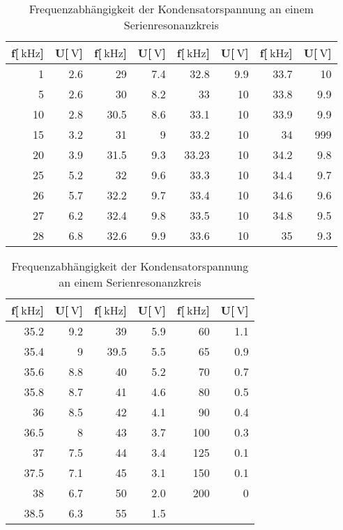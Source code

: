 \begin{table}
\begin{center}
\begin{tabular}{r|r|r|r|r|r|r|r}
f[$\SI{}{\kilo\hertz}$] & U[$\SI{}{\volt}$] & f[$\SI{}{\kilo\hertz}$] & U[$\SI{}{\volt}$] & f[$\SI{}{\kilo\hertz}$] & U[$\SI{}{\volt}$] & f[$\SI{}{\kilo\hertz}$] & U[$\SI{}{\volt}$] \\
\hline
1 & 2.6 & 29 & 7.4 & 32.8 & 9.9 & 33.7 & 10 \\
5 & 2.6 & 30 & 8.2 & 33 & 10 & 33.8 & 9.9 \\
10 & 2.8 & 30.5 & 8.6 & 33.1 & 10 & 33.9 & 9.9 \\
15 & 3.2 & 31 & 9 & 33.2 & 10 & 34 & 999 \\
20 & 3.9 & 31.5 & 9.3 & 33.23 & 10 & 34.2 & 9.8 \\
25 & 5.2 & 32 & 9.6 & 33.3 & 10 & 34.4 & 9.7 \\
26 & 5.7 & 32.2 & 9.7 & 33.4 & 10 & 34.6 & 9.6 \\
27 & 6.2 & 32.4 & 9.8 & 33.5 & 10 & 34.8 & 9.5 \\
28 & 6.8 & 32.6 & 9.9 & 33.6 & 10 & 35 & 9.3 \\
\end{tabular}
\end{center}
\newline
\begin{center}
\begin{tabular}{r|r|r|r|r|r}
f[$\SI{}{\kilo\hertz}$] & U[$\SI{}{\volt}$] & f[$\SI{}{\kilo\hertz}$] & U[$\SI{}{\volt}$] & f[$\SI{}{\kilo\hertz}$] & U[$\SI{}{\volt}$] \\
\hline
35.2 & 9.2 & 39 & 5.9 & 60 & 1.1 \\
35.4 & 9 & 39.5 & 5.5 & 65 & 0.9 \\
35.6 & 8.8 & 40 & 5.2 & 70 & 0.7 \\
35.8 & 8.7 & 41 & 4.6 & 80 & 0.5 \\
36 & 8.5 & 42 & 4.1 & 90 & 0.4 \\
36.5 & 8 & 43 & 3.7 & 100 & 0.3 \\
37 & 7.5 & 44 & 3.4 & 125 & 0.1 \\
37.5 & 7.1 & 45 & 3.1 & 150 & 0.1 \\
38 & 6.7 & 50 & 2.0 & 200 & 0 \\
38.5 & 6.3 & 55 & 1.5 \\
\end{tabular}
\caption[Messwerte zu Aufgabenteil c]{Frequenzabhängigkeit der Kondensatorspannung an einem Serienresonanzkreis}
\label{aufgabe_c}
\end{center}
\end{table}
